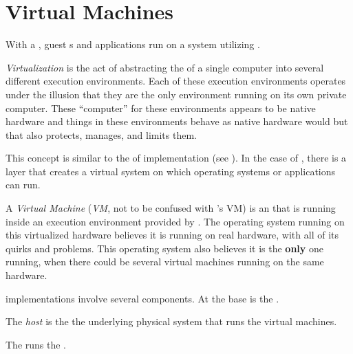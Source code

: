 \section{Virtual Machines}\label{sec:Virtual_Machines}
With a , guest s and applications run on a system utilizing .

\begin{definition}[Virtualization]\label{def:Virtualization}
  \emph{Virtualization} is the act of abstracting the  of a single computer into several different execution environments.
  Each of these execution environments operates under the illusion that they are the only environment running on its own private computer.
  These ``computer'' for these environments appears to be native hardware and things in these environments behave as native hardware would but that also protects, manages, and limits them.
\end{definition}

This concept is similar to the  of  implementation (see ).
In the case of , there is a layer that creates a virtual system on which operating systems or applications can run.

\begin{definition}\label{def:Virtual_Machine}
  A \emph{Virtual Machine} (\emph{VM}, not to be confused with 's VM) is an  that is running inside an execution environment provided by .
  The operating system running on this virtualized hardware believes it is running on real hardware, with all of its quirks and problems.
  This operating system also believes it is the \textbf{only} one running, when there could be several virtual machines running on the same hardware.
\end{definition}

 implementations involve several components.
At the base is the .

\begin{definition}[Host]\label{def:VM_Host}
  The \emph{host} is the the underlying physical  system that runs the virtual machines.
\end{definition}

The  runs the .

